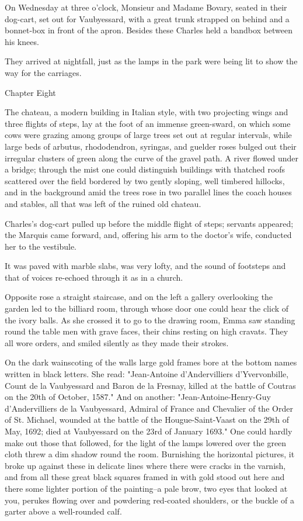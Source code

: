 \documentclass{tufte-book}
\begin{document}
On Wednesday at three o'clock, Monsieur and Madame Bovary, seated in
their dog-cart, set out for Vaubyessard, with a great trunk strapped
on behind and a bonnet-box in front of the apron. Besides these Charles
held a bandbox between his knees.

They arrived at nightfall, just as the lamps in the park were being lit
to show the way for the carriages.



Chapter Eight

The chateau, a modern building in Italian style, with two projecting
wings and three flights of steps, lay at the foot of an immense
green-sward, on which some cows were grazing among groups of large trees
set out at regular intervals, while large beds of arbutus, rhododendron,
syringas, and guelder roses bulged out their irregular clusters of
green along the curve of the gravel path. A river flowed under a bridge;
through the mist one could distinguish buildings with thatched roofs
scattered over the field bordered by two gently sloping, well timbered
hillocks, and in the background amid the trees rose in two parallel
lines the coach houses and stables, all that was left of the ruined old
chateau.

Charles's dog-cart pulled up before the middle flight of steps; servants
appeared; the Marquis came forward, and, offering his arm to the
doctor's wife, conducted her to the vestibule.

It was paved with marble slabs, was very lofty, and the sound of
footsteps and that of voices re-echoed through it as in a church.

Opposite rose a straight staircase, and on the left a gallery
overlooking the garden led to the billiard room, through whose door one
could hear the click of the ivory balls. As she crossed it to go to the
drawing room, Emma saw standing round the table men with grave faces,
their chins resting on high cravats. They all wore orders, and smiled
silently as they made their strokes.

On the dark wainscoting of the walls large gold frames bore at
the bottom names written in black letters. She read: "Jean-Antoine
d'Andervilliers d'Yvervonbille, Count de la Vaubyessard and Baron de la
Fresnay, killed at the battle of Coutras on the 20th of October,
1587." And on another: "Jean-Antoine-Henry-Guy d'Andervilliers de
la Vaubyessard, Admiral of France and Chevalier of the Order of St.
Michael, wounded at the battle of the Hougue-Saint-Vaast on the 29th of
May, 1692; died at Vaubyessard on the 23rd of January 1693." One could
hardly make out those that followed, for the light of the lamps lowered
over the green cloth threw a dim shadow round the room. Burnishing the
horizontal pictures, it broke up against these in delicate lines where
there were cracks in the varnish, and from all these great black squares
framed in with gold stood out here and there some lighter portion of the
painting--a pale brow, two eyes that looked at you, perukes flowing over
and powdering red-coated shoulders, or the buckle of a garter above a
well-rounded calf.
\end{document}

